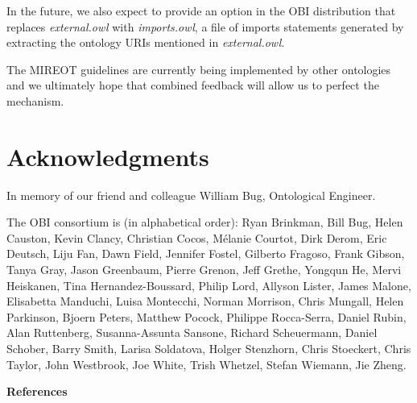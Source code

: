 \documentclass[a4paper,10pt,twocolumn]{article}
\begin{document}
In the future, we also expect to provide an option in the OBI distribution that replaces \emph{external.owl} with \emph{imports.owl}, a file of imports statements generated by extracting the ontology URIs mentioned in \emph{external.owl}.

The MIREOT guidelines are currently being implemented by other ontologies and we ultimately hope that combined feedback will allow us to perfect the mechanism.

\section*{Acknowledgments}

In memory of our friend and colleague William Bug, Ontological Engineer. 

The OBI consortium is (in alphabetical order): Ryan Brinkman, Bill Bug, Helen Causton, Kevin Clancy, Christian Cocos, M\'elanie Courtot, Dirk Derom, Eric Deutsch, Liju Fan, Dawn Field, Jennifer Fostel, Gilberto Fragoso, Frank Gibson, Tanya Gray, Jason Greenbaum, Pierre Grenon, Jeff Grethe, Yongqun He, Mervi Heiskanen, Tina Hernandez-Boussard, Philip Lord, Allyson Lister, James Malone, Elisabetta Manduchi, Luisa Montecchi, Norman Morrison, Chris Mungall, Helen Parkinson, Bjoern Peters, Matthew Pocock, Philippe Rocca-Serra, Daniel Rubin, Alan Ruttenberg, Susanna-Assunta Sansone, Richard Scheuermann, Daniel Schober, Barry Smith, Larisa Soldatova, Holger Stenzhorn, Chris Stoeckert, Chris Taylor, John Westbrook,  Joe White, Trish Whetzel, Stefan Wiemann, Jie Zheng. 

   

{\def\section*#1{}
\begin{center}
\textbf{References}
\end{center}

}
  
\begin{acronym}




\end{acronym}

  \balance
\end{document}
